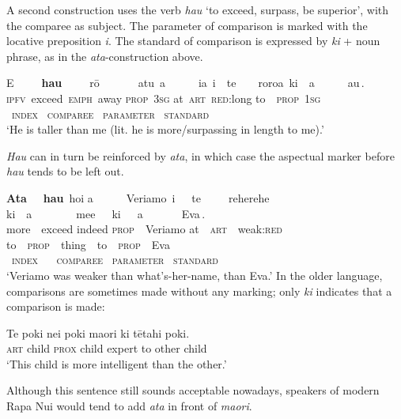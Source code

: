 A second construction uses the verb \textit{hau} ‘to exceed, surpass, be superior’, with the comparee as subject. The parameter of comparison is marked with the locative preposition \textit{{\ꞌ}i}. The standard of comparison is expressed by \textit{ki} + noun phrase, as in the \textit{{\ꞌ}ata}{}-construction above. 

\ea\label{ex:3.114}
\glll {\ob}E~~~~~\textbf{hau}~~~~~rō~~~~~~~atu\,{\cb} {\ob}a~~~~~~ia\,{\cb} {\ob}{\ꞌ}i~~te~~~~roroa\,{\cb} {\ob}ki~~a~~~~~~au\,{\cb}. \\
{\db}\textsc{ipfv}~exceed~\textsc{emph}~away {\db}\textsc{prop}~\textsc{3sg} {\db}at~\textsc{art}~\textsc{red}:long {\db}to~~\textsc{prop}~\textsc{1sg} \\
\textsc{~index} \textsc{~comparee} \textsc{~parameter} \textsc{~standard} \\

\glt
‘He is taller than me (lit. he is more/surpassing in length to me).’ \textstyleExampleref{[Notes]}
\z

\textit{Hau} can in turn be reinforced by \textit{{\ꞌ}ata}, in which case the aspectual marker before \textit{hau} tends to be left out.

\ea\label{ex:3.115}
\glll {\ob}\textbf{{\ꞌ}Ata}~~~\textbf{hau}\,{\cb} ho{\ꞌ}i {\ob}a~~~~~~Veriamo\,{\cb} {\ob}{\ꞌ}i~~~te~~~~~reherehe\,{\cb} {\ob}ki~~a~~~~~~~~me{\ꞌ}e~~~ki~~~a~~~~~~~Eva\,{\cb}. \\
{\db}more~~exceed indeed {\db}\textsc{prop}~~Veriamo {\db}at~~\textsc{art}~~weak:\textsc{red} {\db}to~~\textsc{prop}~~thing~~to~~\textsc{prop}~~Eva \\
\textsc{~index} ~ \textsc{~comparee} \textsc{~parameter} \textsc{~standard} \\

\glt
‘Veriamo was weaker than what’s-her-name, than Eva.’ \textstyleExampleref{[R416.171]} 
\z
In the older language, comparisons are sometimes made without any marking; only \textit{ki} indicates that a comparison is made:

\ea\label{ex:3.116}
\gll Te poki nei poki ma{\ꞌ}ori ki tētahi poki. \\
\textsc{art} child \textsc{prox} child expert to other child \\

\glt
‘This child is more intelligent than the other.’ 
\z

Although this sentence still sounds acceptable nowadays, speakers of modern Rapa Nui would tend to add \textit{{\ꞌ}ata} in front of \textit{ma{\ꞌ}ori}.

